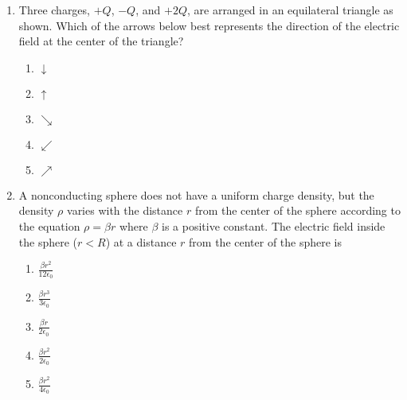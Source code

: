\documentclass{../../oss-apphys}
\begin{document}
\begin{multicols}{2}
\begin{enumerate}[leftmargin=18pt]
  \item Three charges, $+Q$, $-Q$, and $+2Q$, are arranged in an equilateral
    triangle as shown. Which of the arrows below best represents the direction
    of the electric field at the center of the triangle?
    \begin{center}
      \vspace{-.1in}
    \end{center}
    \begin{enumerate}[noitemsep,topsep=0pt,leftmargin=18pt,label=(\Alph*)]
    \item $\displaystyle\downarrow$
    \item $\displaystyle\uparrow$
    \item $\displaystyle\searrow$
    \item $\displaystyle\swarrow$
    \item $\displaystyle\nearrow$
    \end{enumerate}
  
  \item A nonconducting sphere does not have a uniform charge density, but the
    density $\rho$ varies with the distance $r$ from the center of the sphere
    according to the equation $\rho=\beta r$ where $\beta$ is a positive
    constant. The electric field inside the sphere ($r<R$) at a distance $r$
    from the center of the sphere is
    \begin{enumerate}[noitemsep,topsep=0pt,leftmargin=18pt,label=(\Alph*)]
    \item $\displaystyle\frac{\beta r^2}{12\epsilon_0}$
    \item $\displaystyle\frac{\beta r^3}{3\epsilon_0}$
    \item $\displaystyle\frac{\beta r}{2\epsilon_0}$
    \item $\displaystyle\frac{\beta r^2}{2\epsilon_0}$
    \item $\displaystyle\frac{\beta r^2}{4\epsilon_0}$
    \end{enumerate}
  

\end{enumerate}
\end{multicols}
\end{document}
